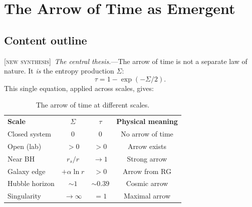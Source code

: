 \documentclass[prl,twocolumn,superscriptaddress,longbibliography,floatfix]{revtex4-2}
\newcommand{\tauasym}{\tau}
\newcommand{\newsyn}{\textsc{[new synthesis]}}
\begin{document}
\section{The Arrow of Time as Emergent}
\label{sec:time_arrow}

\subsection*{Content outline}

\newsyn\ \emph{The central thesis.}---The arrow of time is not a
separate law of nature. It \emph{is} the entropy production $\Sigma$:
\begin{equation}
\tauasym = 1 - \exp(-\Sigma/2).
\label{eq:tau_sigma}
\end{equation}
This single equation, applied across scales, gives:

\begin{table}[htbp]
\caption{\label{tab:time_arrow}The arrow of time at different scales.}
\begin{ruledtabular}
\begin{tabular}{lccc}
\textbf{Scale} & $\Sigma$ & $\tauasym$ & \textbf{Physical meaning} \\
\colrule
Closed system & $0$ & $0$ & No arrow of time \\
Open (lab) & $> 0$ & $> 0$ & Arrow exists \\
Near BH & $r_s/r$ & $\to 1$ & Strong arrow \\
Galaxy edge & $+ \alpha\ln r$ & $> 0$ & Arrow from RG \\
Hubble horizon & $\sim 1$ & $\sim 0.39$ & Cosmic arrow \\
Singularity & $\to \infty$ & $= 1$ & Maximal arrow \\
\end{tabular}
\end{ruledtabular}
\end{table}
\end{document}
